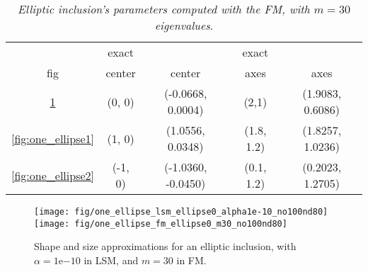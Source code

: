 \begin{table}
\caption{\emph{Elliptic inclusion's parameters computed with the FM, with $m=30$ eigenvalues}.}
\label{tab:ellipse-parameters}
\begin{center}
\vspace*{-0.5cm}
\begin{tabular}{ccccc}
\toprule
 & exact && exact &\\
 fig & center & center & axes  & axes \\
\midrule
\ref{fig:one_ellipse0} & (0, 0) &  (-0.0668, 0.0004) & (2,1) & (1.9083, 0.6086) \\
\ref{fig:one_ellipse1} & (1, 0) &  (1.0556, 0.0348) & (1.8, 1.2) & (1.8257, 1.0236) \\
\ref{fig:one_ellipse2} & (-1, 0) &  (-1.0360, -0.0450) & (0.1, 1.2) & (0.2023, 1.2705) \\
\bottomrule
\end{tabular}
\end{center}
\end{table}

\begin{center}
\begin{figure}
{
\texttt{[image: fig/one\_ellipse\_lsm\_ellipse0\_alpha1e-10\_no100nd80]}
}
{
\texttt{[image: fig/one\_ellipse\_fm\_ellipse0\_m30\_no100nd80]}
}
\caption{Shape and size approximations for an elliptic inclusion, with $\alpha=\mathrm{1e}{-10}$ in LSM, 
and $m=30$ in FM.}
\label{fig:one_ellipse0}
\end{figure}
\end{center}



